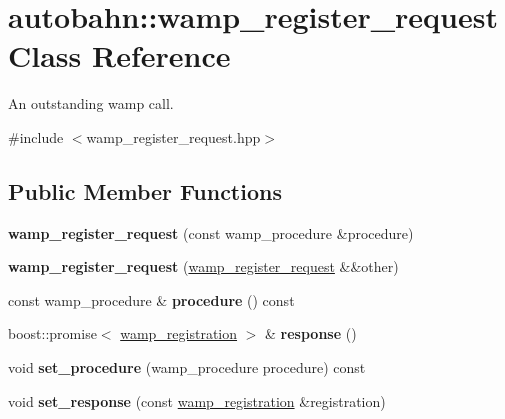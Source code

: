 \hypertarget{classautobahn_1_1wamp__register__request}{}\section{autobahn\+:\+:wamp\+\_\+register\+\_\+request Class Reference}
\label{classautobahn_1_1wamp__register__request}


An outstanding wamp call.  




{\ttfamily \#include $<$wamp\+\_\+register\+\_\+request.\+hpp$>$}

\subsection*{Public Member Functions}
\begin{DoxyCompactItemize}
\item 
{\bfseries wamp\+\_\+register\+\_\+request} (const wamp\+\_\+procedure \&procedure)\hypertarget{classautobahn_1_1wamp__register__request_ae019ff5cc82e3a619cfc4876f486a0e5}{}\label{classautobahn_1_1wamp__register__request_ae019ff5cc82e3a619cfc4876f486a0e5}

\item 
{\bfseries wamp\+\_\+register\+\_\+request} (\hyperlink{classautobahn_1_1wamp__register__request}{wamp\+\_\+register\+\_\+request} \&\&other)\hypertarget{classautobahn_1_1wamp__register__request_aa69652ae23e63517a9095846fe5a8248}{}\label{classautobahn_1_1wamp__register__request_aa69652ae23e63517a9095846fe5a8248}

\item 
const wamp\+\_\+procedure \& {\bfseries procedure} () const \hypertarget{classautobahn_1_1wamp__register__request_af9c802aaf8b675f0ccf2e7bac770432e}{}\label{classautobahn_1_1wamp__register__request_af9c802aaf8b675f0ccf2e7bac770432e}

\item 
boost\+::promise$<$ \hyperlink{classautobahn_1_1wamp__registration}{wamp\+\_\+registration} $>$ \& {\bfseries response} ()\hypertarget{classautobahn_1_1wamp__register__request_aca7447774813e45a99cd829a10c9308d}{}\label{classautobahn_1_1wamp__register__request_aca7447774813e45a99cd829a10c9308d}

\item 
void {\bfseries set\+\_\+procedure} (wamp\+\_\+procedure procedure) const \hypertarget{classautobahn_1_1wamp__register__request_abf3e1cfe0e21ef3e0b659551efb3435e}{}\label{classautobahn_1_1wamp__register__request_abf3e1cfe0e21ef3e0b659551efb3435e}

\item 
void {\bfseries set\+\_\+response} (const \hyperlink{classautobahn_1_1wamp__registration}{wamp\+\_\+registration} \&registration)\hypertarget{classautobahn_1_1wamp__register__request_ab7ae470d8884dffb7d4f5c8345960bb6}{}\label{classautobahn_1_1wamp__register__request_ab7ae470d8884dffb7d4f5c8345960bb6}

\end{DoxyCompactItemize}


